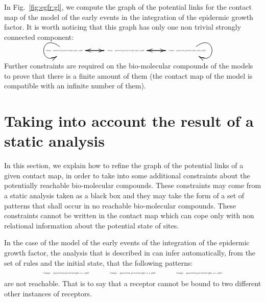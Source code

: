 \documentclass{entcs}
\begin{document}
\begin{exmp}
In Fig.~\ref{fig:egfr:gl}, we compute the graph of the potential links for the contact map of the model of the early events in the integration of the epidermic growth factor. It is worth noticing that this graph has only one non trivial strongly connected component:
\begin{equation*}\hspace*{1cm}\scalebox{1.5}{\xymatrix@C=0.2cm@R=0.35cm{\begin{minipage}{1.2cm}\scalebox{0.15}{\texttt{[image: generated\_pictures/egfr\_egfr\_c.pdf]}}\end{minipage}
  \ar@{->}[rr]
  \ar@{->}@(ul,dl)
  &&
\begin{minipage}{1.2cm}\scalebox{0.15}{\texttt{[image: generated\_pictures/egfr\_egfr\_r.pdf]}}\end{minipage}
  \ar@{->}[ll]
  \ar@{->}[rr]&&
\begin{minipage}{1.5cm}\scalebox{0.15}{\texttt{[image: generated\_pictures/egfr\_egfr\_n.pdf]}}\end{minipage}
  \ar@{->}[ll]
  \ar@{->}@(ur,dr)&&}}\end{equation*}
Further constraints are required on the bio-molecular compounds of the models to prove that there is a finite amount of them (the contact map of the model is compatible with an infinite number of them).
\end{exmp}

\section{Taking into account the result of a static analysis}

In this section, we explain how to refine the graph of the potential links of a given contact map, in order to take into some additional constraints about the potentially reachable bio-molecular compounds.
These constraints may come from a static analysis \cite{SASB2016,KaSa} taken as a black box and they may take the form of a set of patterns that shall occur in no reachable bio-molecular compounds.
These constraints cannot be written in the contact map which can cope only with non relational information about the potential state of sites.

In the case of the model of the early events of the integration of the epidermic growth factor, the analysis that is described in \cite{SASB2016} can infer automatically, from the set of rules and the initial state, that the following patterns:
\begin{equation*}
\scalebox{0.3}{\texttt{[image: generated\_pictures/egfr\_r\_c.pdf]}}\hspace*{1cm} \scalebox{0.3}{\texttt{[image: generated\_pictures/egfr\_r\_n.pdf]}}\hspace*{1cm} \scalebox{0.3}{\texttt{[image: generated\_pictures/egfr\_n\_c.pdf]}}
\end{equation*}
are not reachable. That is to say that a receptor cannot be bound to two different other instances of receptors.
\end{document}
